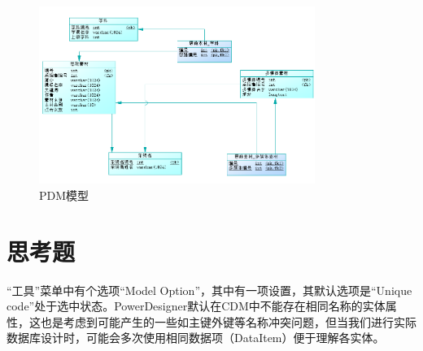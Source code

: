 \documentclass[11pt]{article}
\begin{document}
  \begin{figure}[p]
    \centering
    \includegraphics[width=0.8\textwidth]{PDM模型.png}
    \caption{PDM模型}
    \label{tab:PDMmodel}
  \end{figure}
  \pagebreak
  \section{思考题}

  “工具”菜单中有个选项“Model Option”，其中有一项设置，其默认选项是“Unique code”处于选中状态。PowerDesigner默认在CDM中不能存在相同名称的实体属性，这也是考虑到可能产生的一些如主键外键等名称冲突问题，但当我们进行实际数据库设计时，可能会多次使用相同数据项（DataItem）便于理解各实体。
  
\end{document}
